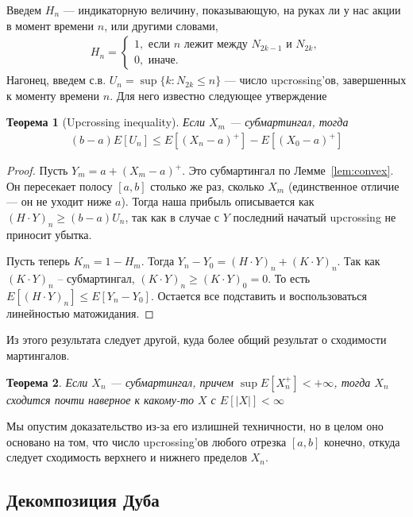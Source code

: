 \documentclass[12pt]{article}
\newtheorem{theorem}{Теорема}
\begin{document}
Введем $H_n$ --- индикаторную величину, показывающую, на руках ли у нас акции в момент времени $n$, или другими словами,
\begin{align*}
  H_n = \begin{cases}
    1, \text{ если }n\text{ лежит между }N_{2k - 1}\text{ и }N_{2k},\\
    0, \text{ иначе}.
  \end{cases}
\end{align*}
Нагонец, введем с.в. $U_n = \sup\{k : N_{2k} \le n\}$ --- число upcrossing'ов, завершенных к моменту времени $n$. Для него известно следующее утверждение
\begin{theorem}[Upcrossing inequality]
  Если $X_m$ --- субмартингал, тогда
  \begin{align*}
    (b - a)E[U_n] \le E[(X_n - a)^+] - E[(X_0 - a)^+]
  \end{align*}
\end{theorem}
\begin{proof}
  Пусть $Y_m = a + (X_m - a)^+$. Это субмартингал по Лемме~\ref{lem:convex}. Он пересекает полосу $[a,b]$ столько же раз, сколько $X_m$ (единственное отличие --- он не уходит ниже $a$). Тогда наша прибыль описывается как $(H \cdot Y)_n \ge (b - a)U_n$, так как в случае с $Y$ последний начатый upcrossing не приносит убытка.

  Пусть теперь $K_m = 1 - H_m$. Тогда $Y_n - Y_0 = (H \cdot Y)_n + (K \cdot Y)_n$. Так как $(K \cdot Y)_n$ -- субмартингал, $(K \cdot Y)_n \ge (K \cdot Y)_0 = 0$. То есть $E[(H \cdot Y)_n] \le E[Y_n - Y_0]$. Остается все подставить и воспользоваться линейностью матожидания.
\end{proof}

Из этого результата следует другой, куда более общий результат о сходимости мартингалов.

\begin{theorem}
  Если $X_n$ --- субмартингал, причем $\sup E[X_n^+] < +\infty$, тогда $X_n$ сходится почти наверное к какому-то $X$ с $E[|X|] < \infty$
\end{theorem}

Мы опустим доказательство из-за его излишней техничности, но в целом оно основано на том, что число upcrossing'ов любого отрезка $[a , b]$ конечно, откуда следует сходимость верхнего и нижнего пределов $X_n$.

\subsection{Декомпозиция Дуба}
\end{document}

